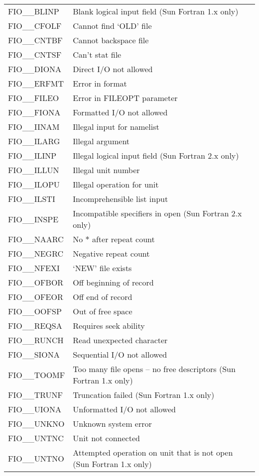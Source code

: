 \documentclass[twoside,11pt,nolof]{starlink}
\begin{document}
\begin{tabular}{ll}
FIO\_\_BLINP & Blank logical input field (Sun Fortran 1.x only) \\
FIO\_\_CFOLF & Cannot find `OLD' file \\
FIO\_\_CNTBF & Cannot backspace file \\
FIO\_\_CNTSF & Can't stat file \\
FIO\_\_DIONA & Direct I/O not allowed \\
FIO\_\_ERFMT & Error in format \\
FIO\_\_FILEO & Error in FILEOPT parameter \\
FIO\_\_FIONA & Formatted I/O not allowed \\
FIO\_\_IINAM & Illegal input for namelist \\
FIO\_\_ILARG & Illegal argument \\
FIO\_\_ILINP & Illegal logical input field (Sun Fortran 2.x only) \\
FIO\_\_ILLUN & Illegal unit number \\
FIO\_\_ILOPU & Illegal operation for unit \\
FIO\_\_ILSTI & Incomprehensible list input \\
FIO\_\_INSPE & Incompatible specifiers in open (Sun Fortran 2.x only) \\
FIO\_\_NAARC & No $*$ after repeat count \\
FIO\_\_NEGRC & Negative repeat count \\
FIO\_\_NFEXI & `NEW' file exists \\
FIO\_\_OFBOR & Off beginning of record \\
FIO\_\_OFEOR & Off end of record \\
FIO\_\_OOFSP & Out of free space \\
FIO\_\_REQSA & Requires seek ability \\
FIO\_\_RUNCH & Read unexpected character \\
FIO\_\_SIONA & Sequential I/O not allowed \\
FIO\_\_TOOMF & Too many file opens -- no free descriptors (Sun Fortran 1.x
only) \\
FIO\_\_TRUNF & Truncation failed (Sun Fortran 1.x only) \\
FIO\_\_UIONA & Unformatted I/O not allowed \\
FIO\_\_UNKNO & Unknown system error \\
FIO\_\_UNTNC & Unit not connected \\
FIO\_\_UNTNO & Attempted operation on unit that is not open (Sun Fortran 1.x
only) \\
\end{tabular}
\end{document}
